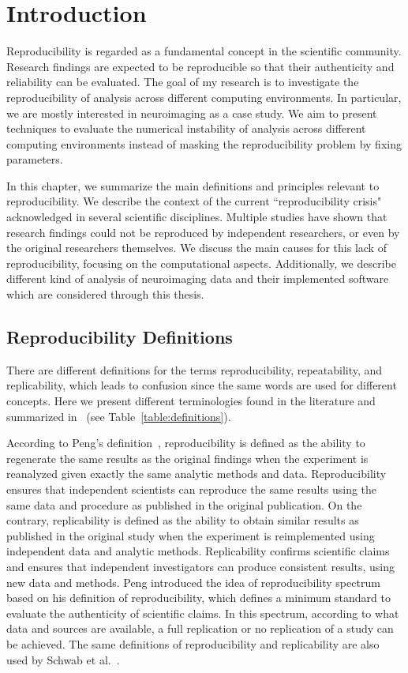 \chapter{Introduction}
\label{ch:intro}

Reproducibility is regarded as a fundamental concept in the scientific 
community. Research findings are expected to be reproducible so that 
their authenticity and reliability can be evaluated. The goal of my 
research is to investigate the reproducibility of analysis across different 
computing environments. In particular, we are mostly interested in 
neuroimaging as a case study. We aim to present techniques to evaluate 
the numerical instability of analysis across different computing environments 
instead of masking the reproducibility problem by fixing parameters.

In this chapter, we summarize the main definitions and 
principles relevant to reproducibility. We describe the context of the 
current ``reproducibility crisis" acknowledged in several scientific 
disciplines. Multiple studies have shown that research findings could 
not be reproduced by independent researchers, or even by the original 
researchers themselves. We discuss the main causes for this lack of 
reproducibility, focusing on the computational aspects. 
Additionally, we describe different kind of analysis of 
neuroimaging data and their implemented software which are considered 
through this thesis. 


\section{Reproducibility Definitions}

There are different definitions for the terms reproducibility, 
repeatability, and replicability, which leads to confusion since the 
same words are used for different concepts. Here we present different 
terminologies found in the literature and summarized 
in~\cite{plesser2018reproducibility} (see 
Table~\ref{table:definitions}).
 
According to Peng's definition~\cite{peng2011reproducible}, 
reproducibility is defined as the ability to regenerate the same 
results as the original findings when the experiment is reanalyzed 
given exactly the same analytic methods and data. Reproducibility 
ensures that independent scientists can reproduce the same results 
using the same data and procedure as published in the original 
publication. On the contrary, replicability is defined as the ability 
to obtain similar results as published in the original study when 
the experiment is reimplemented using independent data and analytic 
methods. Replicability confirms scientific claims and ensures that 
independent investigators can produce consistent results, using new 
data and methods. Peng introduced the idea of reproducibility 
spectrum based on his definition of reproducibility, which defines a 
minimum standard to evaluate the authenticity of scientific claims. 
In this spectrum, according to what data and sources are available, a 
full replication or no replication of a study can be achieved. 
The same definitions of reproducibility and replicability 
are also used by Schwab et al.~\cite{schwab2000making}.

